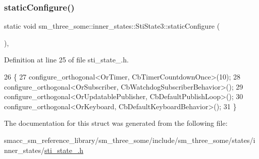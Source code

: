 \subsubsection{\texorpdfstring{static\+Configure()}{staticConfigure()}}
{\footnotesize\ttfamily static void sm\+\_\+three\+\_\+some\+::inner\+\_\+states\+::\+Sti\+State3\+::static\+Configure (\begin{DoxyParamCaption}{ }\end{DoxyParamCaption})\hspace{0.3cm}{\ttfamily [inline]}, {\ttfamily [static]}}



Definition at line 25 of file sti\+\_\+state\+\_.\+h.


\begin{DoxyCode}
26   \{
27     configure\_orthogonal<OrTimer, CbTimerCountdownOnce>(10);
28     configure\_orthogonal<OrSubscriber, CbWatchdogSubscriberBehavior>();
29     configure\_orthogonal<OrUpdatablePublisher, CbDefaultPublishLoop>();
30     configure\_orthogonal<OrKeyboard, CbDefaultKeyboardBehavior>();
31   \}
\end{DoxyCode}


The documentation for this struct was generated from the following file\+:\begin{DoxyCompactItemize}
\item 
smacc\+\_\+sm\+\_\+reference\+\_\+library/sm\+\_\+three\+\_\+some/include/sm\+\_\+three\+\_\+some/states/inner\+\_\+states/\hyperlink{sti__state__3_8h}{sti\+\_\+state\+\_.\+h}\end{DoxyCompactItemize}
